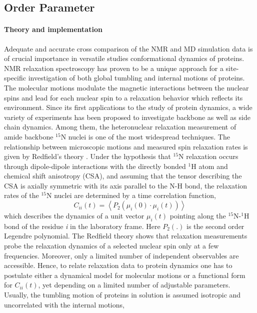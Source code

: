 \documentclass[a4paper,11pt]{article}
\begin{document}
\subsection{Order Parameter}
\label{op}
\paragraph{Theory and implementation\\}
\label{op_theory}
Adequate and accurate cross comparison of the NMR and \gls{MD} simulation data is of crucial importance in versatile studies
conformational dynamics of proteins. NMR relaxation spectroscopy has proven to be a unique approach for a site-specific
investigation of both global tumbling and internal motions of proteins. The molecular motions modulate the magnetic
interactions between the nuclear spins and lead for each nuclear spin to a relaxation behavior which reflects its environment.
Since its first applications to the study of protein dynamics, a wide variety of experiments has been proposed to
investigate backbone as well as side chain dynamics. Among them, the heteronuclear relaxation measurement of amide
backbone $^{15}$N nuclei is one of the most widespread techniques. The relationship between microscopic motions and measured
spin relaxation rates is given by Redfield's theory \cite{Refield}. Under the hypothesis that $^{15}$N relaxation occurs through
dipole-dipole interactions with the directly bonded $^{1}$H atom and chemical shift anisotropy (CSA), and assuming that the
tensor describing the CSA is axially symmetric with its axis parallel to the N-H bond, the relaxation rates of the $^{15}$N
nuclei are determined by a time correlation function,
\begin{equation}
\label{eq:op_cii}
C_{ii}(t) = \left\langle P_2(\mu_i(0) \cdot \mu_i(t)) \right\rangle
\end{equation}
which describes the dynamics of a unit vector $\mu_i(t)$ pointing along the $^{15}$N-$^{1}$H bond of the residue \textit{i} in the laboratory
frame. Here $P_2(.)$ is the second order Legendre polynomial.
The Redfield theory shows that relaxation measurements probe the relaxation dynamics of a selected nuclear spin only at a
few frequencies. Moreover, only a limited number of independent observables are accessible. Hence, to relate relaxation
data to protein dynamics one has to postulate either a dynamical model for molecular motions or a functional form
for $C_{ii}(t)$, yet depending on a limited number of adjustable parameters.
Usually, the tumbling motion of proteins in solution is assumed isotropic and uncorrelated with the internal motions,
\end{document}
